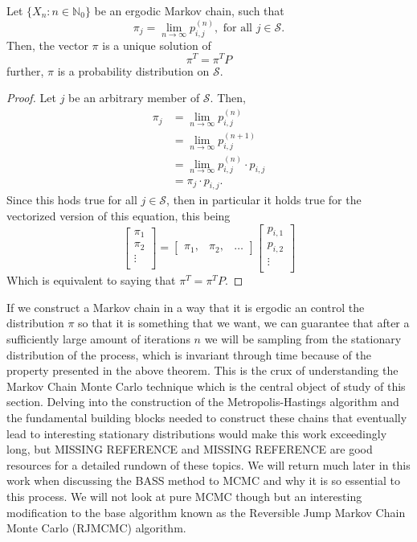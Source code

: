 \begin{theorem}
	Let $\{ X_n: n \in \mathbb{N}_0\}$ be an ergodic Markov chain, such that 
	\[ \pi_j = \lim_{n \rightarrow \infty} p_{i,j}^{(n)}, \text{ for all } j \in \mathcal{S}. \]
	Then, the vector $\pi$ is a unique solution of 
	\[ \pi^T = \pi^T P \]
	further, $\pi$ is a probability distribution on $\mathcal{S}$. 
\end{theorem}

\begin{proof}
	Let $j$ be an arbitrary member of $\mathcal{S}$. Then, 
	\begin{align*}
		\pi_j &= \lim_{n \rightarrow \infty} p_{i,j}^{(n)} \\
		&= \lim_{n \rightarrow \infty} p_{i,j}^{(n+1)} \\
		&= \lim_{n \rightarrow \infty} p_{i,j}^{(n)} \cdot p_{i,j} \\
		&= \pi_j \cdot p_{i,j}.
	\end{align*}
	Since this hods true for all $j \in \mathcal{S}$, then in particular it holds true for the vectorized version of this equation, this being 
	\[ \begin{bmatrix}
		\pi_1 \\
		\pi_2 \\
		\vdots \\
	\end{bmatrix} = 
	\begin{bmatrix}
		\pi_1, &
		\pi_2, &
		\ldots 
	\end{bmatrix} 
	\begin{bmatrix}
		p_{i,1} \\
		p_{i,2} \\
		\vdots \\
	\end{bmatrix} \]
Which is equivalent to saying that $\pi^T = \pi^T P$.
\end{proof}

If we construct a Markov chain in a way that it is ergodic an control the distribution $\pi$ so that it is something that we want, we can guarantee that after a sufficiently large amount of iterations $n$ we will be sampling from the stationary distribution of the process, which is invariant through time because of the property presented in the above theorem. This is the crux of understanding the Markov Chain Monte Carlo technique which is the central object of study of this section. Delving into the construction of the Metropolis-Hastings algorithm and the fundamental building blocks needed to construct these chains that eventually lead to interesting stationary distributions would make this work exceedingly long, but MISSING REFERENCE and MISSING REFERENCE are good resources for a detailed rundown of these topics. We will return much later in this work when discussing the BASS method to MCMC and why it is so essential to this process. We will not look at pure MCMC though but an interesting modification to the base algorithm known as the Reversible Jump Markov Chain Monte Carlo (RJMCMC) algorithm. 

